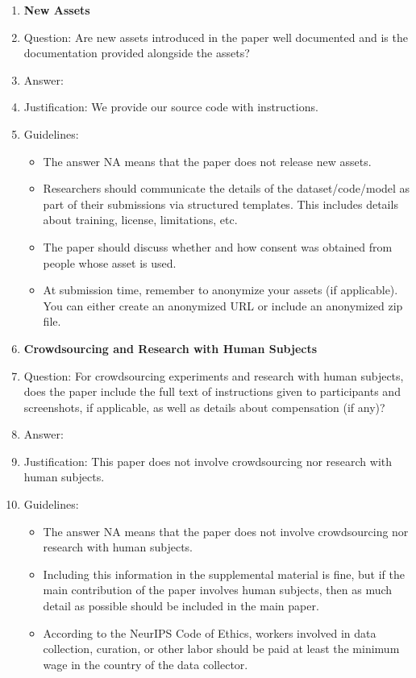 \documentclass{article}
\begin{document}
\begin{enumerate}
\item {\bf New Assets}
    \item[] Question: Are new assets introduced in the paper well documented and is the documentation provided alongside the assets?
    \item[] Answer: \answerYes{} %
    \item[] Justification: We provide our source code with instructions.
    \item[] Guidelines:
    \begin{itemize}
        \item The answer NA means that the paper does not release new assets.
        \item Researchers should communicate the details of the dataset/code/model as part of their submissions via structured templates. This includes details about training, license, limitations, etc. 
        \item The paper should discuss whether and how consent was obtained from people whose asset is used.
        \item At submission time, remember to anonymize your assets (if applicable). You can either create an anonymized URL or include an anonymized zip file.
    \end{itemize}

\item {\bf Crowdsourcing and Research with Human Subjects}
    \item[] Question: For crowdsourcing experiments and research with human subjects, does the paper include the full text of instructions given to participants and screenshots, if applicable, as well as details about compensation (if any)? 
    \item[] Answer: \answerNA{} %
    \item[] Justification: This paper does not involve crowdsourcing nor research with human subjects.
    \item[] Guidelines:
    \begin{itemize}
        \item The answer NA means that the paper does not involve crowdsourcing nor research with human subjects.
        \item Including this information in the supplemental material is fine, but if the main contribution of the paper involves human subjects, then as much detail as possible should be included in the main paper. 
        \item According to the NeurIPS Code of Ethics, workers involved in data collection, curation, or other labor should be paid at least the minimum wage in the country of the data collector. 
    \end{itemize}


\end{enumerate}
\end{document}

